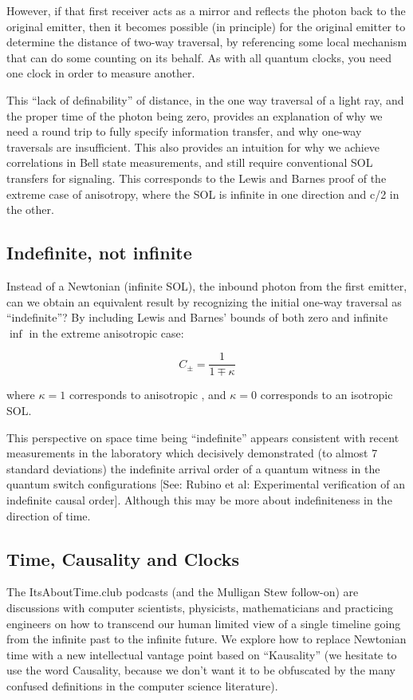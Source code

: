 However, if that first receiver acts as a mirror and reflects the photon back to the original emitter, then it becomes possible (in principle) for the original emitter to determine the distance of two-way traversal, by referencing some local mechanism that can do some counting on its behalf. As with all quantum clocks, you need one clock in order to measure another. 

This “lack of definability” of distance, in the one way traversal of a light ray, and the proper time of the photon being zero, provides an explanation of why we need a round trip to fully specify information transfer, and why one-way traversals are insufficient.
This also provides an intuition for why we achieve correlations in Bell state measurements, and still require conventional SOL transfers for signaling. This corresponds to the Lewis and Barnes proof of the extreme case of anisotropy, where the SOL is infinite in one direction and c/2 in the other.


\subsection{Indefinite, not infinite}
Instead of a Newtonian (infinite SOL), the inbound photon from the first emitter, can we obtain an equivalent result by recognizing the initial one-way traversal as “indefinite”? By including Lewis and Barnes’ bounds of both zero and infinite \(\inf\) in the extreme anisotropic case:

\[
C_{\pm} = \frac{1}{1 \mp \kappa}
\]

where $\kappa = 1$ corresponds to anisotropic , and $\kappa = 0$ corresponds to an isotropic SOL.

This perspective on space time being “indefinite” appears consistent with recent measurements in the laboratory which decisively demonstrated (to almost 7 standard deviations) the indefinite arrival order of a quantum witness in the quantum switch configurations [See: Rubino et al: Experimental verification of an indefinite causal order]. Although this may be more about indefiniteness in the direction of time.

\subsection{Time, Causality and Clocks}
The ItsAboutTime.club podcasts (and the Mulligan Stew follow-on) are discussions with computer scientists, physicists, mathematicians and practicing engineers on how to transcend our human limited view of a single timeline going from the infinite past to the infinite future. We explore how to replace Newtonian time with a new intellectual vantage point based on “Kausality” (we hesitate to use the word Causality, because we don’t want it to be obfuscated by the many confused definitions in the computer  science literature).

